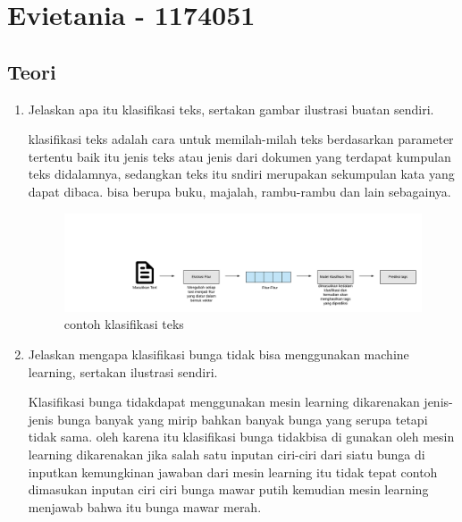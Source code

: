\section{Evietania - 1174051}

\subsection{Teori}
\begin{enumerate}
\item Jelaskan apa itu klasifikasi teks, sertakan gambar ilustrasi buatan sendiri.\par
klasifikasi teks adalah cara untuk memilah-milah teks berdasarkan parameter tertentu baik itu jenis teks atau jenis dari dokumen yang terdapat kumpulan teks didalamnya, sedangkan teks itu sndiri merupakan sekumpulan kata yang dapat dibaca. bisa berupa buku, majalah, rambu-rambu dan lain sebagainya.

\begin{figure}[ht]
\centering
\includegraphics[scale=0.2]{figures/1174051/4/1.png}
\caption{contoh klasifikasi teks}
\label{contoh}
\end{figure}

\item Jelaskan mengapa klasifikasi bunga tidak bisa menggunakan machine learning, sertakan ilustrasi sendiri.\par
Klasifikasi bunga tidakdapat menggunakan mesin learning dikarenakan jenis-jenis bunga banyak yang mirip bahkan banyak bunga yang serupa tetapi tidak sama. oleh karena itu klasifikasi bunga tidakbisa di gunakan oleh mesin learning dikarenakan jika salah satu inputan ciri-ciri dari siatu bunga di inputkan kemungkinan jawaban dari mesin learning itu tidak tepat contoh dimasukan inputan ciri ciri bunga mawar putih kemudian mesin learning menjawab bahwa itu bunga mawar merah.


\end{enumerate}
